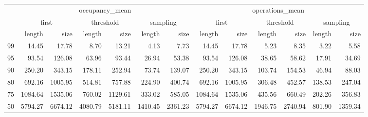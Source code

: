 \begin{tabular}{lrrrrrrrrrrrr}
\toprule
{} & \multicolumn{6}{c}{occupancy\_mean} & \multicolumn{6}{c}{operations\_mean} \\
{} & \multicolumn{2}{c}{first} & \multicolumn{2}{c}{threshold} & \multicolumn{2}{c}{sampling} & \multicolumn{2}{c}{first} & \multicolumn{2}{c}{threshold} & \multicolumn{2}{c}{sampling} \\
{} &         length &    size &    length &    size &   length &    size &          length &    size &    length &    size &   length &    size \\
\midrule
99 &          14.45 &   17.78 &      8.70 &   13.21 &     4.13 &    7.73 &           14.45 &   17.78 &      5.23 &    8.35 &     3.22 &    5.58 \\
95 &          93.54 &  126.08 &     63.96 &   93.44 &    26.94 &   53.38 &           93.54 &  126.08 &     38.65 &   58.62 &    17.91 &   34.69 \\
90 &         250.20 &  343.15 &    178.11 &  252.94 &    73.74 &  139.07 &          250.20 &  343.15 &    103.74 &  154.53 &    46.94 &   88.03 \\
80 &         692.16 & 1005.95 &    514.81 &  757.88 &   224.90 &  400.74 &          692.16 & 1005.95 &    306.48 &  452.57 &   138.53 &  247.04 \\
75 &        1084.64 & 1535.06 &    760.02 & 1129.61 &   333.02 &  585.05 &         1084.64 & 1535.06 &    435.56 &  660.49 &   202.26 &  356.83 \\
50 &        5794.27 & 6674.12 &   4080.79 & 5181.11 &  1410.45 & 2361.23 &         5794.27 & 6674.12 &   1946.75 & 2740.94 &   801.90 & 1359.34 \\
\bottomrule
\end{tabular}
